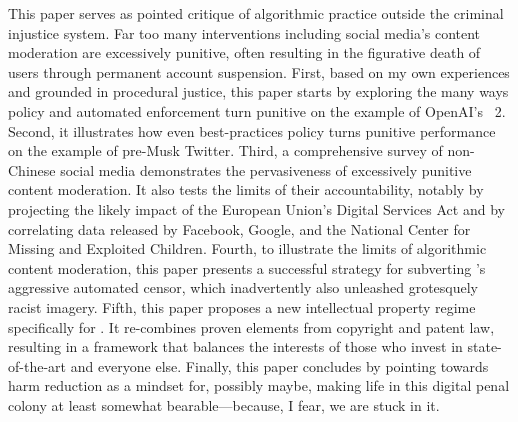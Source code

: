 This paper serves as pointed critique of algorithmic practice outside the
criminal injustice system. Far too many interventions including social media's
content moderation are excessively punitive, often resulting in the figurative
death of users through permanent account suspension. First, based on my own
experiences and grounded in procedural justice, this paper starts by exploring
the many ways policy and automated enforcement turn punitive on the example of
OpenAI's \DALLE\ 2. Second, it illustrates how even best-practices policy turns
punitive performance on the example of pre-Musk Twitter. Third, a comprehensive
survey of non-Chinese social media demonstrates the pervasiveness of excessively
punitive content moderation. It also tests the limits of their accountability,
notably by projecting the likely impact of the European Union's Digital Services
Act and by correlating data released by Facebook, Google, and the National
Center for Missing and Exploited Children. Fourth, to illustrate the limits of
algorithmic content moderation, this paper presents a successful strategy for
subverting \DALLE's aggressive automated censor, which inadvertently also
unleashed grotesquely racist imagery. Fifth, this paper proposes a new
intellectual property regime specifically for . It re-combines proven
elements from copyright and patent law, resulting in a framework that balances
the interests of those who invest in state-of-the-art  and everyone else.
Finally, this paper concludes by pointing towards harm reduction as a mindset
for, possibly maybe, making life in this digital penal colony at least somewhat
bearable---because, I fear, we are stuck in it.
